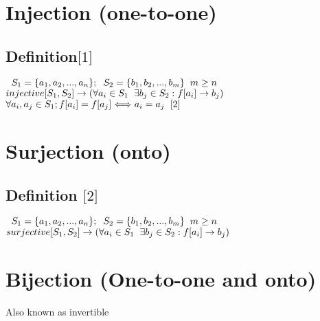 \documentclass[11pt]{article}
\begin{document}
\section{Injection (one-to-one)}
\subsection{Definition$\lbrack 1 \rbrack$}
\begin{center}
$\hspace{2mm} S_1 = \{a_1,a_2,...,a_n\}; \hspace{2mm} S_2 = \{b_1,b_2,...,b_m\} \hspace{2mm} m \geq n$
\\ \vspace{2mm}
$injective \lbrack S_1, S_2 \rbrack \rightarrow (\forall a_i \in S_1 \hspace{2mm} \exists b_j \in S_2 : f \lbrack a_i \rbrack \rightarrow b_j)$
\\ \vspace{2mm}
$\forall a_i,a_j \in S_1; f \lbrack a_i \rbrack = f \lbrack a_j \rbrack \Longleftrightarrow a_i = a_j \hspace{2mm} \lbrack 2 \rbrack$
\end{center}





\section{Surjection (onto)}
\subsection{Definition $\lbrack 2 \rbrack$}
\begin{center}
$\hspace{2mm} S_1 = \{a_1,a_2,...,a_n\}; \hspace{2mm} S_2 = \{b_1,b_2,...,b_m\} \hspace{2mm} m \geq n$
\\ \vspace{2mm}
$surjective \lbrack S_1, S_2 \rbrack \rightarrow (\forall a_i \in S_1 \hspace{2mm} \exists b_j \in S_2 : f \lbrack a_i \rbrack \rightarrow b_j)$
\end{center}







\section{Bijection (One-to-one and onto)}
Also known as invertible
\end{document}
